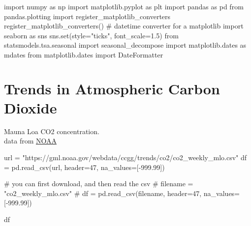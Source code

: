 \documentclass[
  letterpaper,
  DIV=11,
  numbers=noendperiod,
  oneside]{scrreprt}
\newenvironment{Shaded}{\begin{snugshade}}{\end{snugshade}}
\newcommand{\BuiltInTok}[1]{\textcolor[rgb]{0.00,0.23,0.31}{#1}}
\newcommand{\CommentTok}[1]{\textcolor[rgb]{0.37,0.37,0.37}{#1}}
\newcommand{\DecValTok}[1]{\textcolor[rgb]{0.68,0.00,0.00}{#1}}
\newcommand{\FloatTok}[1]{\textcolor[rgb]{0.68,0.00,0.00}{#1}}
\newcommand{\ImportTok}[1]{\textcolor[rgb]{0.00,0.46,0.62}{#1}}
\newcommand{\NormalTok}[1]{\textcolor[rgb]{0.00,0.23,0.31}{#1}}
\newcommand{\OperatorTok}[1]{\textcolor[rgb]{0.37,0.37,0.37}{#1}}
\newcommand{\StringTok}[1]{\textcolor[rgb]{0.13,0.47,0.30}{#1}}
\begin{document}
\begin{Shaded}
\begin{Highlighting}[]
\ImportTok{import}\NormalTok{ numpy }\ImportTok{as}\NormalTok{ np}
\ImportTok{import}\NormalTok{ matplotlib.pyplot }\ImportTok{as}\NormalTok{ plt}
\ImportTok{import}\NormalTok{ pandas }\ImportTok{as}\NormalTok{ pd}
\ImportTok{from}\NormalTok{ pandas.plotting }\ImportTok{import}\NormalTok{ register\_matplotlib\_converters}
\NormalTok{register\_matplotlib\_converters()  }\CommentTok{\# datetime converter for a matplotlib}
\ImportTok{import}\NormalTok{ seaborn }\ImportTok{as}\NormalTok{ sns}
\NormalTok{sns.}\BuiltInTok{set}\NormalTok{(style}\OperatorTok{=}\StringTok{"ticks"}\NormalTok{, font\_scale}\OperatorTok{=}\FloatTok{1.5}\NormalTok{)}
\ImportTok{from}\NormalTok{ statsmodels.tsa.seasonal }\ImportTok{import}\NormalTok{ seasonal\_decompose}
\ImportTok{import}\NormalTok{ matplotlib.dates }\ImportTok{as}\NormalTok{ mdates}
\ImportTok{from}\NormalTok{ matplotlib.dates }\ImportTok{import}\NormalTok{ DateFormatter}
\end{Highlighting}
\end{Shaded}

\hypertarget{trends-in-atmospheric-carbon-dioxide}{%
\chapter{Trends in Atmospheric Carbon
Dioxide}\label{trends-in-atmospheric-carbon-dioxide}}

Mauna Loa CO2 concentration.\\
data from \href{https://gml.noaa.gov/ccgg/trends/data.html}{NOAA}

\begin{Shaded}
\begin{Highlighting}[]
\NormalTok{url }\OperatorTok{=} \StringTok{"https://gml.noaa.gov/webdata/ccgg/trends/co2/co2\_weekly\_mlo.csv"}
\NormalTok{df }\OperatorTok{=}\NormalTok{ pd.read\_csv(url, header}\OperatorTok{=}\DecValTok{47}\NormalTok{, na\_values}\OperatorTok{=}\NormalTok{[}\OperatorTok{{-}}\FloatTok{999.99}\NormalTok{])}

\CommentTok{\# you can first download, and then read the csv}
\CommentTok{\# filename = "co2\_weekly\_mlo.csv"}
\CommentTok{\# df = pd.read\_csv(filename, header=47, na\_values=[{-}999.99])}

\NormalTok{df}
\end{Highlighting}
\end{Shaded}
\end{document}
